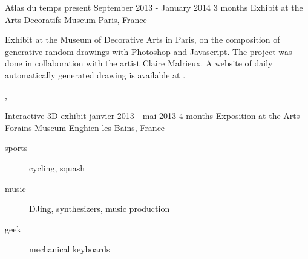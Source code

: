 \documentclass[a4paper]{article}
\begin{document}
\cvexperiencetitle
{Atlas du temps present}
{September 2013 - January 2014}
{3 months}
{Exhibit at the Arts Decoratifs Museum}
{Paris, France}

\begin{cvexperience}%
  Exhibit at the Museum of Decorative Arts in Paris, on the composition of
  generative random drawings with Photoshop and Javascript. The project was
  done in collaboration with the artist Claire Malrieux. A website of daily
  automatically generated drawing is available at
  .

  \begin{cvexperiencetech}[Technologies]%
    ,
  \end{cvexperiencetech}
\end{cvexperience}

\cvexperiencetitle
{Interactive 3D exhibit}
{janvier 2013 - mai 2013}
{4 months}
{Exposition at the Arts Forains Museum}
{Enghien-les-Bains, France}




\begin{description}%
  \item[sports] cycling, squash
  \item[music] DJing, synthesizers, music production
  \item[geek] mechanical keyboards
\end{description}
\end{document}
